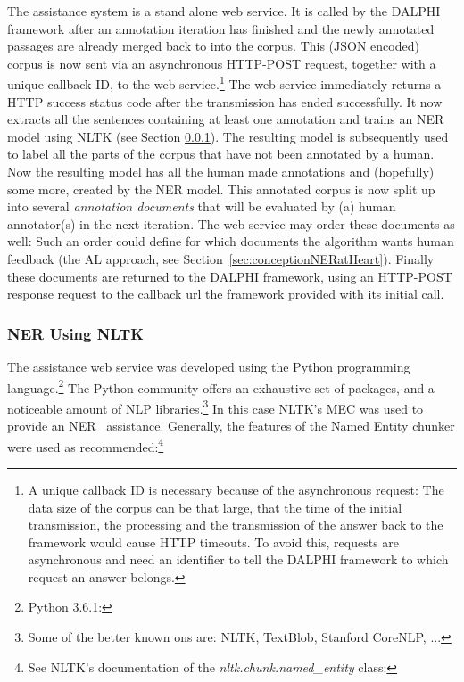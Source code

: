 		The assistance system is a stand alone web service. It is called by the \ac{DALPHI} framework after an annotation iteration has finished and the newly annotated passages are already merged back to into the corpus. This (\ac{JSON} encoded) corpus is now sent via an asynchronous HTTP-POST request, together with a unique callback ID, to the web service.\footnote{A unique callback ID is necessary because of the asynchronous request: The data size of the corpus can be that large, that the time of the initial transmission, the processing and the transmission of the answer back to the framework would cause HTTP timeouts. To avoid this, requests are asynchronous and need an identifier to tell the \ac{DALPHI} framework to which request an answer belongs.}
		The web service immediately returns a HTTP success status code after the transmission has ended successfully. It now extracts all the sentences containing at least one annotation and trains an \ac{NER} model using \ac{NLTK} (see Section \ref{sec:nerWithNLTK}). The resulting model is subsequently used to label all the parts of the corpus that have not been annotated by a human. Now the resulting model has all the human made annotations and (hopefully) some more, created by the \ac{NER} model. This annotated corpus is now split up into several \textit{annotation documents} that will be evaluated by (a) human annotator(s) in the next iteration. The web service may order these documents as well: Such an order could define for which documents the algorithm wants human feedback (the \ac{AL} approach, see Section~\ref{sec:conceptionNERatHeart}). Finally these documents are returned to the \ac{DALPHI} framework, using an HTTP-POST response request to the callback url the framework provided with its initial call.

	\subsubsection{\acl{NER} Using \acs{NLTK}}
		\label{sec:nerWithNLTK}
		The assistance web service was developed using the Python programming language.\footnote{Python 3.6.1: }
		The Python community offers an exhaustive set of packages, and a noticeable amount of \ac{NLP} libraries.\footnote{Some of the better known ons are: \ac{NLTK}, TextBlob, Stanford CoreNLP, ...}
		In this case \ac{NLTK}'s \acl{MEC} was used to provide an \ac{NER}~\cite{nltkinfoextract} assistance. Generally, the features of the Named Entity chunker were used as recommended:\footnote{See \ac{NLTK}'s documentation of the \textit{nltk.chunk.named\_entity} class: }

